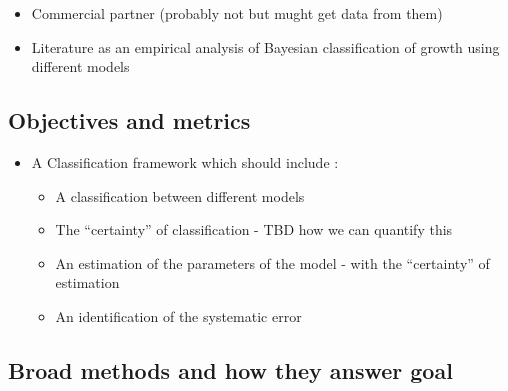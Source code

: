 \documentclass[]{article}
\providecommand{\tightlist}{%
  \setlength{\itemsep}{0pt}\setlength{\parskip}{0pt}}
\begin{document}
\begin{itemize}
\tightlist
\item
  Commercial partner (probably not but mught get data from them)
\item
  Literature as an empirical analysis of Bayesian classification of
  growth using different models
\end{itemize}

\hypertarget{objectives-and-metrics}{%
\subsection{Objectives and metrics}\label{objectives-and-metrics}}

\begin{itemize}
\tightlist
\item
  A Classification framework which should include :

  \begin{itemize}
  \tightlist
  \item
    A classification between different models
  \item
    The ``certainty'' of classification - TBD how we can quantify this
  \item
    An estimation of the parameters of the model - with the
    ``certainty'' of estimation
  \item
    An identification of the systematic error
  \end{itemize}
\end{itemize}

\hypertarget{broad-methods-and-how-they-answer-goal}{%
\subsection{Broad methods and how they answer
goal}\label{broad-methods-and-how-they-answer-goal}}
\end{document}
